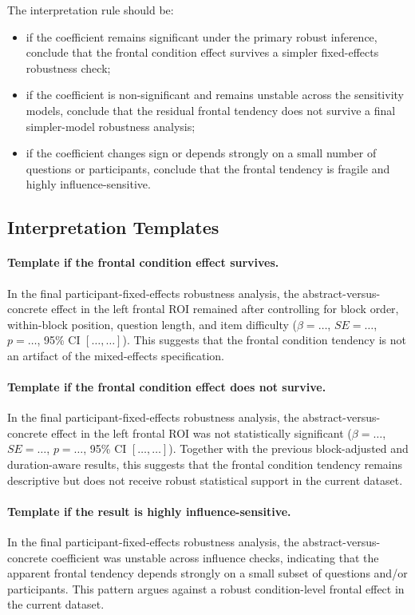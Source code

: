 The interpretation rule should be:
\begin{itemize}
    \item if the coefficient remains significant under the primary robust inference, conclude that
    the frontal condition effect survives a simpler fixed-effects robustness check;
    \item if the coefficient is non-significant and remains unstable across the sensitivity models,
    conclude that the residual frontal tendency does not survive a final simpler-model robustness analysis;
    \item if the coefficient changes sign or depends strongly on a small number of questions or participants,
    conclude that the frontal tendency is fragile and highly influence-sensitive.
\end{itemize}

\subsection{Interpretation Templates}

\paragraph{Template if the frontal condition effect survives.}
In the final participant-fixed-effects robustness analysis, the abstract-versus-concrete effect
in the left frontal ROI remained after controlling for block order, within-block position,
question length, and item difficulty
(\(\beta=\ldots\), \(SE=\ldots\), \(p=\ldots\), 95\% CI \([\ldots,\ldots]\)).
This suggests that the frontal condition tendency is not an artifact of the mixed-effects specification.

\paragraph{Template if the frontal condition effect does not survive.}
In the final participant-fixed-effects robustness analysis, the abstract-versus-concrete effect
in the left frontal ROI was not statistically significant
(\(\beta=\ldots\), \(SE=\ldots\), \(p=\ldots\), 95\% CI \([\ldots,\ldots]\)).
Together with the previous block-adjusted and duration-aware results, this suggests that the frontal
condition tendency remains descriptive but does not receive robust statistical support in the current dataset.

\paragraph{Template if the result is highly influence-sensitive.}
In the final participant-fixed-effects robustness analysis, the abstract-versus-concrete coefficient
was unstable across influence checks, indicating that the apparent frontal tendency depends strongly
on a small subset of questions and/or participants.
This pattern argues against a robust condition-level frontal effect in the current dataset.

